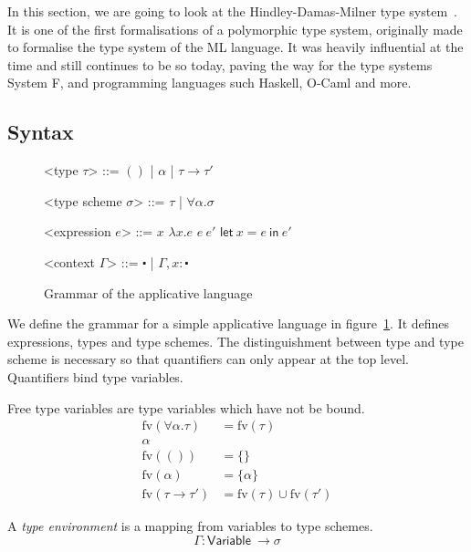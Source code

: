 In this section, we are going to look at the Hindley-Damas-Milner type
system~\cite{damas1982}. It is one of the first formalisations of a
polymorphic type system, originally made to formalise the type system
of the ML language. It was heavily influential at the time and still
continues to be so today, paving the way for the type systems System
F, and programming languages such Haskell, O-Caml and more.

\subsection{Syntax}

\def\defaultHypSeparation{\hskip .05in}
\newcommand{\letin}[2]{\mathsf{let} \ #1 \ \mathsf{in} \ #2}

\begin{figure}
  \begin{grammar}

    <type $\tau$> ::= $()$ | $\alpha$ | $\tau \rightarrow \tau'$
    
    <type scheme $\sigma$> ::= $\tau$ | $\forall \alpha . \sigma$

    <expression $e$> ::= $x$
    \alt $\lambda x . e$
    \alt $e \ e'$
    \alt $\mathsf{let} \ x = e \ \mathsf{in} \ e'$

    <context $\Gamma$> ::= $\centerdot$ | $\Gamma, x : \centerdot$

  \end{grammar}
  \caption{Grammar of the applicative language}\label{grm:applang}
\end{figure}

We define the grammar for a simple applicative language in
figure~\ref{grm:applang}.
It defines expressions, types and type schemes. The distinguishment
between type and type scheme is necessary so that quantifiers can only
appear at the top level. Quantifiers bind type variables.

Free type variables are type variables which have not be bound.
\begin{align*}
  \mathrm{fv}(\forall \alpha . \tau) &= \mathrm{fv}(\tau) \\ {\alpha} \\
  \mathrm{fv}(()) &= \{ \} \\
  \mathrm{fv}(\alpha) &= \{ \alpha \} \\
  \mathrm{fv}(\tau \rightarrow \tau') &= \mathrm{fv}(\tau) \cup \mathrm{fv}(\tau')
\end{align*}

A \textit{type environment} is a mapping from variables to type schemes. 
\[\Gamma : \mathsf{Variable} \ \rightarrow \sigma\]

